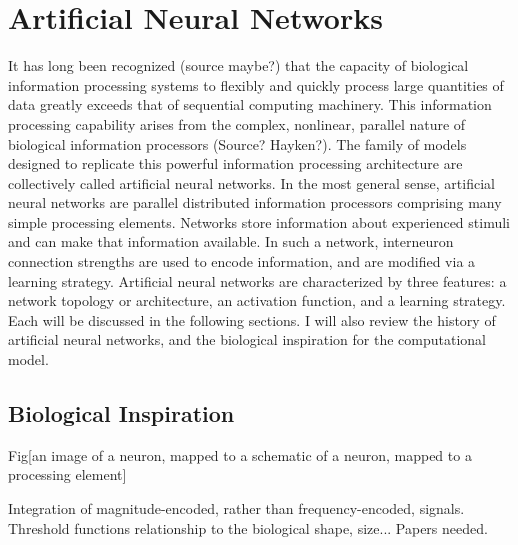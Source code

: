 \documentclass[11pt]{afthesis}
\begin{document}
	\section{Artificial Neural Networks}
	
	
	It has long been recognized (source maybe?) that the capacity of biological information processing systems to flexibly and quickly process large quantities of data greatly exceeds that of sequential computing machinery. This information processing capability arises from the complex, nonlinear, parallel nature of biological information processors (Source? Hayken?). The family of models designed to replicate this powerful information processing architecture are collectively called artificial neural networks. In the most general sense, artificial neural networks are parallel distributed information processors \cite{haykin1999} comprising many simple processing elements. Networks store information about experienced stimuli and can make that information available. In such a network, interneuron connection strengths are used to encode information, and are modified via a learning strategy. Artificial neural networks are characterized by three features: a network topology or architecture, an activation function, and a learning strategy. Each will be discussed in the following sections. I will also review the history of artificial neural networks, and the biological inspiration for the computational model.
	
	\subsection{Biological Inspiration}
	
	Fig[an image of a neuron, mapped to a schematic of a neuron, mapped to a processing element]
	
	Integration of magnitude-encoded, rather than frequency-encoded, signals. 
	Threshold functions relationship to the biological shape, size... Papers needed.
	
\end{document}
